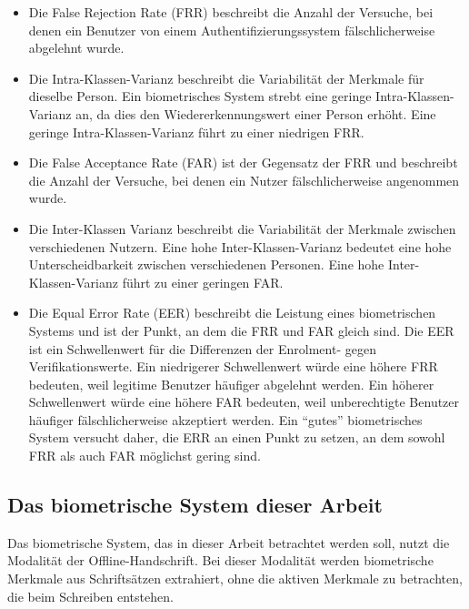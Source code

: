\documentclass{article}
\begin{document}
\begin{itemize}
	\item Die False Rejection Rate (FRR) beschreibt die Anzahl der Versuche, bei denen ein Benutzer
		von einem Authentifizierungssystem fälschlicherweise abgelehnt wurde.
	\item Die Intra-Klassen-Varianz beschreibt die Variabilität der Merkmale für dieselbe Person.
		Ein biometrisches System strebt eine geringe Intra-Klassen-Varianz an, da dies den
		Wiedererkennungswert einer Person erhöht. Eine geringe Intra-Klassen-Varianz führt zu
		einer niedrigen FRR. 
	\item Die False Acceptance Rate (FAR) ist der Gegensatz der FRR und beschreibt die Anzahl
		der Versuche, bei denen ein Nutzer fälschlicherweise angenommen wurde. 
	\item Die Inter-Klassen Varianz beschreibt die Variabilität der Merkmale zwischen verschiedenen Nutzern.
		Eine hohe Inter-Klassen-Varianz bedeutet eine hohe Unterscheidbarkeit zwischen verschiedenen Personen.
		Eine hohe Inter-Klassen-Varianz führt zu einer geringen FAR.
	\item Die Equal Error Rate (EER) beschreibt die Leistung eines biometrischen Systems und ist der Punkt,
		an dem die FRR und FAR gleich sind. Die EER ist ein Schwellenwert für die Differenzen der Enrolment- gegen
		Verifikationswerte. Ein niedrigerer Schwellenwert würde eine höhere FRR bedeuten, weil legitime Benutzer
		häufiger abgelehnt werden. Ein höherer Schwellenwert würde eine höhere FAR bedeuten, weil unberechtigte
		Benutzer häufiger fälschlicherweise akzeptiert werden. Ein “gutes” biometrisches System versucht daher,
		die ERR an einen Punkt zu setzen, an dem sowohl FRR als auch FAR möglichst gering sind.
\end{itemize}

\subsection{Das biometrische System dieser Arbeit}

Das biometrische System, das in dieser Arbeit betrachtet werden soll, nutzt die Modalität der Offline-Handschrift.
Bei dieser Modalität werden biometrische Merkmale aus Schriftsätzen extrahiert, ohne die aktiven Merkmale
zu betrachten, die beim Schreiben entstehen. 
\end{document}
